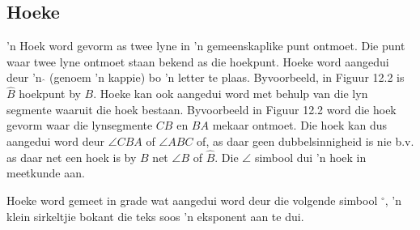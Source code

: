 % 
% 
\subsection*{Hoeke}

’n Hoek word gevorm as twee lyne in ’n gemeenskaplike punt ontmoet. Die punt waar twee lyne ontmoet staan
bekend as die hoekpunt. Hoeke word aangedui deur ’n $\hat{}$ (genoem ’n kappie) bo ’n letter te plaas. Byvoorbeeld, in Figuur 12.2 is $\hat{B}$ hoekpunt by $B$. Hoeke kan ook aangedui word met behulp van die lyn segmente waaruit die hoek bestaan. Byvoorbeeld in Figuur 12.2 word die hoek gevorm waar die lynsegmente $CB$ en $BA$ mekaar
ontmoet. Die hoek kan dus aangedui word deur $\angle CBA$ of $\angle ABC$ of, as daar geen dubbelsinnigheid is nie b.v. as daar net een hoek is by $B$ net $\angle B$ of $\hat{B}$. Die $\angle $ simbool dui ’n hoek in meetkunde aan.\par 
Hoeke word gemeet in grade wat aangedui word deur die volgende simbool $^{\circ }$, 'n klein sirkeltjie bokant die teks soos 'n eksponent aan te dui.\par 

